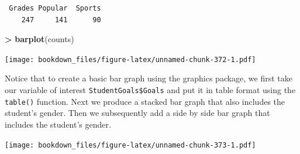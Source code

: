 \documentclass[
]{krantz}
\makeatletter
\newenvironment{Shaded}{\begin{snugshade}}{\end{snugshade}}
\newcommand{\DataTypeTok}[1]{\textcolor[rgb]{0.27,0.27,0.27}{#1}}
\newcommand{\DecValTok}[1]{\textcolor[rgb]{0.06,0.06,0.06}{#1}}
\newcommand{\KeywordTok}[1]{\textcolor[rgb]{0.27,0.27,0.27}{\textbf{#1}}}
\newcommand{\NormalTok}[1]{#1}
\newcommand{\OperatorTok}[1]{\textcolor[rgb]{0.43,0.43,0.43}{\textbf{#1}}}
\newcommand{\StringTok}[1]{\textcolor[rgb]{0.5,0.5,0.5}{#1}}
\newenvironment{kframe}{%
\medskip{}
\setlength{\fboxsep}{.8em}
 \def\at@end@of@kframe{}%
 \ifinner\ifhmode%
  \def\at@end@of@kframe{\end{minipage}}%
  \begin{minipage}{\columnwidth}%
 \fi\fi%
 \def\FrameCommand##1{\hskip\@totalleftmargin \hskip-\fboxsep
 \colorbox{shadecolor}{##1}\hskip-\fboxsep
     \hskip-\linewidth \hskip-\@totalleftmargin \hskip\columnwidth}%
 \MakeFramed {\advance\hsize-\width
   \@totalleftmargin\z@ \linewidth\hsize
   \@setminipage}}%
 {\par\unskip\endMakeFramed%
 \at@end@of@kframe}
\renewenvironment{Shaded}{\begin{kframe}}{\end{kframe}}
\makeatother
\begin{document}
\begin{verbatim}
 Grades Popular  Sports 
    247     141      90 
\end{verbatim}

\begin{Shaded}
\begin{Highlighting}[]
\OperatorTok{\textgreater{}}\StringTok{ }\KeywordTok{barplot}\NormalTok{(counts)}
\end{Highlighting}
\end{Shaded}

\texttt{[image: bookdown\_files/figure-latex/unnamed-chunk-372-1.pdf]}

Notice that to create a basic bar graph using the graphics package, we first take our variable of interest \texttt{StudentGoals\$Goals} and put it in table format using the \texttt{table()} function. Next we produce a stacked bar graph that also includes the student's gender. Then we subsequently add a side by side bar graph that includes the student's gender.

\begin{Shaded}
\end{Shaded}

\texttt{[image: bookdown\_files/figure-latex/unnamed-chunk-373-1.pdf]}
\end{document}
